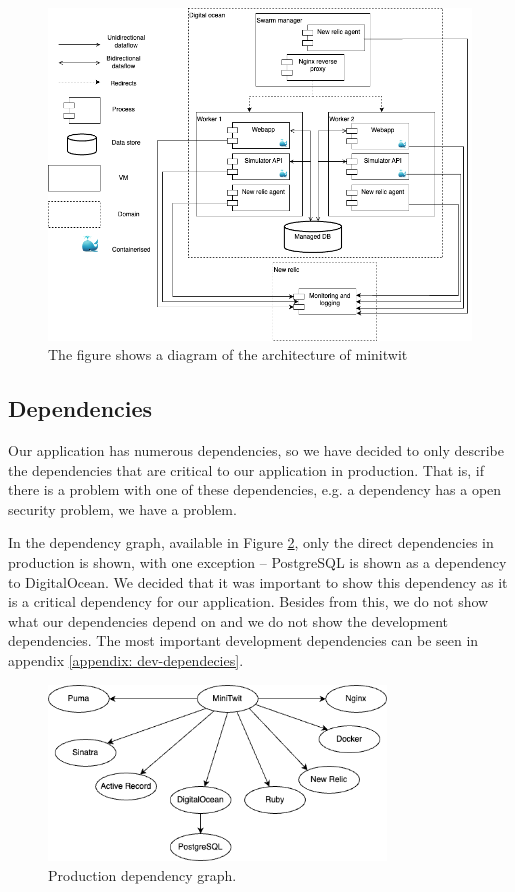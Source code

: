 \documentclass{article}
\begin{document}
\begin{figure}[H]
    \centering
    \includegraphics[width=\textwidth]{images/devops-overview.png}
    \caption{The figure shows a diagram of the architecture of minitwit}
    \label{fig:architecture}
\end{figure}

\subsection{Dependencies}
Our application has numerous dependencies, so we have decided to only describe the dependencies that are critical to our application in production. That is, if there is a problem with one of these dependencies, e.g. a dependency has a open security problem, we have a problem. 

In the dependency graph, available in Figure \ref{fig:dep-prod}, only the direct dependencies in production is shown, with one exception -- PostgreSQL is shown as a dependency to DigitalOcean. We decided that it was important to show this dependency as it is a critical dependency for our application.
Besides from this, we do not show what our dependencies depend on and we do not show the development dependencies. The most important development dependencies can be seen in appendix \ref{appendix: dev-dependecies}.

\begin{figure}[H]
    \centering
    \includegraphics[width=0.8\textwidth]{images/dependency-graph-prod.png}
    \caption{Production dependency graph.}
    \label{fig:dep-prod}
\end{figure}
\end{document}
